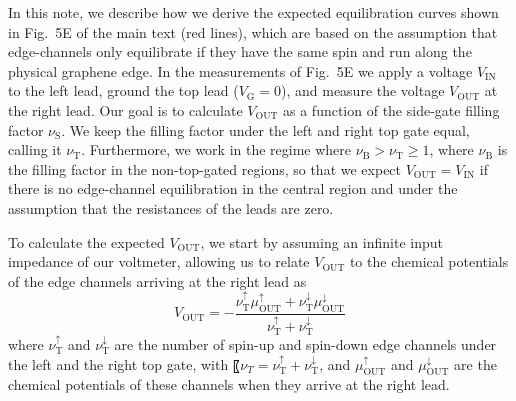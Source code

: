 \documentclass[%
reprint,amsmath,amssymb,aps,prl,superscriptaddress,
twocolumn
]{revtex4-1}
\begin{document}
		In this note, we describe how we derive the expected equilibration curves shown in Fig.~5E of the main text (red lines), which are based on the assumption that edge-channels only equilibrate if they have the same spin and run along the physical graphene edge.
		In the measurements of Fig.~5E we apply a voltage $V_\mathrm{IN}$ to the left lead, ground the top lead ($V_\mathrm{G}=0$), and measure the voltage $V_\mathrm{OUT}$ at the right lead. Our goal is to calculate $V_\mathrm{OUT}$ as a function of the side-gate filling factor $\nu_\mathrm{S}$. We keep the filling factor under the left and right top gate equal, calling it $\nu_\mathrm{T}$. Furthermore, we work in the regime where $\nu_\mathrm{B} > \nu_\mathrm{T} \geq 1$, where $\nu_\mathrm{B}$ is the filling factor in the non-top-gated regions, so that we expect $V_\mathrm{OUT}=V_\mathrm{IN}$ if there is no edge-channel equilibration in the central region and under the assumption that the resistances of the leads are zero. 
		
		To calculate the expected $V_\mathrm{OUT}$, we start by assuming an infinite input impedance of our voltmeter, allowing us to relate $V_\mathrm{OUT}$ to the chemical potentials of the edge channels arriving at the right lead as
		\begin{equation}
		V_\mathrm{OUT} = -\frac{\nu_\mathrm{T}^\uparrow \mu_\mathrm{OUT}^\uparrow+\nu_\mathrm{T}^\downarrow \mu_\mathrm{OUT}^\downarrow}{\nu_\mathrm{T}^{\uparrow}+\nu_\mathrm{T}^\downarrow}
		\label{eqn:5p1}
		\end{equation}
		where $\nu_\mathrm{T}^\uparrow$ and $\nu_\mathrm{T}^\downarrow$ are the number of spin-up and spin-down edge channels under the left and the right top gate, with 〖$\nu_T = \nu_\mathrm{T}^\uparrow + \nu_\mathrm{T}^\downarrow$, and $\mu_\mathrm{OUT}^\uparrow$ and $\mu_\mathrm{OUT}^\downarrow$ are the chemical potentials of these channels when they arrive at the right lead. 
		
\end{document}
